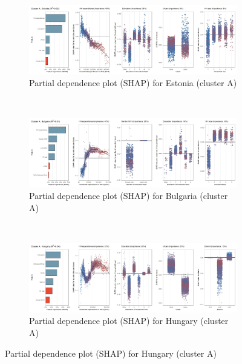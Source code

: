 \begin{figure}[ht!]
     \centering
     \begin{subfigure}[b]{\textwidth}
         \centering
         \caption{Partial dependence plot (SHAP) for Estonia (cluster A)}
         \label{fig:5b_EST}
         \includegraphics[width=\textwidth]{Figure 5b/Figure_5b_EST}      
     \end{subfigure}
    \\
    \vspace{0.5cm}
     \begin{subfigure}[b]{\textwidth}
         \centering
         \caption{Partial dependence plot (SHAP) for Bulgaria (cluster A)}
         \label{fig:5b_BGR}
         \includegraphics[width=\textwidth]{Figure 5b/Figure_5b_BGR}
     \end{subfigure}
    \\
    \vspace{0.5cm}
     \begin{subfigure}[b]{1\textwidth}
         \centering
         \caption{Partial dependence plot (SHAP) for Hungary (cluster A)}
         \label{fig:5b_HUN}
         \includegraphics[width=\textwidth]{Figure 5b/Figure_5b_HUN}
     \end{subfigure}

\end{figure}
